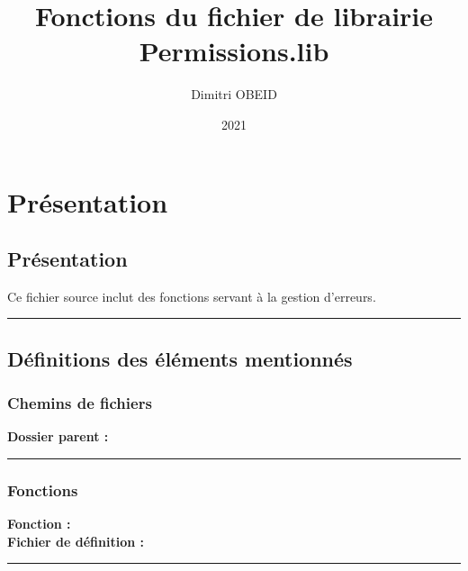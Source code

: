 \documentclass[a4paper,10pt]{article}
\title{\color{red}Fonctions du fichier de librairie \color{lime}Permissions.lib}\color{white}
\author{Dimitri OBEID}
\date{2021}
\begin{document}
 \maketitle
 \tableofcontents
 \newpage

\color{red}
\section{Présentation}\color{white}

\color{green}
\subsection{Présentation}\color{white}
Ce fichier source inclut des fonctions servant à la gestion d'erreurs.\\[1\baselineskip]



\color{green}\par\noindent\rule{\textwidth}{0.4pt}\color{white}

\color{green}
\subsection{Définitions des éléments mentionnés}\color{white}

\color{blue}
\subsubsection{Chemins de fichiers}\color{white}
\textbf{Dossier parent :} \textbf{\color{lime}\color{white}}\\[1\baselineskip]



\color{blue}\par\noindent\rule{\textwidth}{0.4pt}\color{white}

\color{blue}
\subsubsection{Fonctions}\color{white}
\textbf{Fonction :} \textbf{\color{mauve}\color{white}}\\[1\baselineskip]

\textbf{Fichier de définition :} \textbf{\color{lime}\color{white}}\\[1\baselineskip]



\color{blue}\par\noindent\rule{\textwidth}{0.4pt}\color{white}
\end{document}
